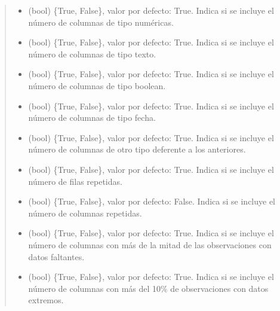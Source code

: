 \documentclass[letterpaper,10pt,openany,spanish]{sphinxmanual}
\begin{document}
\begin{fulllineitems}
\begin{fulllineitems}
\begin{quote}
\begin{description}
\begin{itemize}
\item {} 
 \textendash{} (bool) \{True, False\}, valor por defecto: True.             Indica si se incluye el número de columnas de tipo numéricas.

\item {} 
 \textendash{} (bool) \{True, False\}, valor por defecto: True.             Indica si se incluye el número de columnas de tipo texto.

\item {} 
 \textendash{} (bool) \{True, False\}, valor por defecto: True.             Indica si se incluye el número de columnas de tipo boolean.

\item {} 
 \textendash{} (bool) \{True, False\}, valor por defecto: True.             Indica si se incluye el número de columnas de tipo fecha.

\item {} 
 \textendash{} (bool) \{True, False\}, valor por defecto: True.             Indica si se incluye el número de columnas de otro tipo deferente             a los anteriores.

\item {} 
 \textendash{} (bool) \{True, False\}, valor por defecto: True.             Indica si se incluye el número de filas repetidas.

\item {} 
 \textendash{} (bool) \{True, False\}, valor por defecto:             False. Indica si se incluye el número de columnas repetidas.

\item {} 
 \textendash{} (bool) \{True, False\}, valor por defecto: True.             Indica si se incluye el número de columnas con más de la mitad de             las observaciones con datos faltantes.

\item {} 
 \textendash{} (bool) \{True, False\}, valor por defecto: True.             Indica si se incluye el número de columnas con más del 10\% de                 observaciones con datos extremos.


\end{itemize}
\end{description}
\end{quote}
\end{fulllineitems}
\end{fulllineitems}
\end{document}
